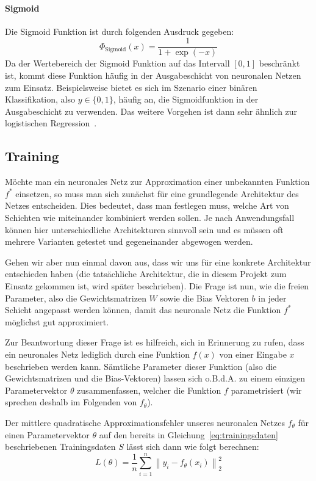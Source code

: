 \paragraph{Sigmoid} Die Sigmoid Funktion ist durch folgenden Ausdruck gegeben:
\begin{equation*}
    \Phi_\text{Sigmoid}(x) = \frac{1}{1 + \exp{(-x)}}
\end{equation*}
Da der Wertebereich der Sigmoid Funktion auf das Intervall $[0, 1]$
beschr\"ankt ist, kommt diese Funktion h\"aufig in der Ausgabeschicht
von neuronalen Netzen zum Einsatz. Beispielsweise bietet es sich im
Szenario einer bin\"aren Klassifikation, also $y \in \{0, 1\}$, h\"aufig
an, die Sigmoidfunktion in der Ausgabeschicht zu verwenden.
Das weitere Vorgehen ist dann sehr \"ahnlich zur
logistischen Regression~\cite{statistical_learning}.

\subsection{Training}
\label{sec:training}

M\"ochte man ein neuronales Netz zur Approximation einer unbekannten
Funktion $f^*$ einsetzen, so muss man sich zun\"achst f\"ur eine
grundlegende Architektur des Netzes entscheiden.
Dies bedeutet, dass man festlegen muss, welche Art von Schichten wie
miteinander kombiniert werden sollen.
Je nach Anwendungsfall k\"onnen hier unterschiedliche Architekturen
sinnvoll sein und es m\"ussen oft mehrere Varianten getestet und
gegeneinander abgewogen werden.

Gehen wir aber nun einmal davon aus, dass wir uns f\"ur eine konkrete
Architektur entschieden haben (die tats\"achliche Architektur, die in
diesem Projekt zum Einsatz gekommen ist, wird sp\"ater beschrieben).
Die Frage ist nun, wie die freien Parameter, also die
Gewichtsmatrizen $W$ sowie die Bias Vektoren $b$ in jeder Schicht angepasst
werden k\"onnen, damit das neuronale Netz die Funktion $f^*$ m\"oglichst
gut approximiert.

Zur Beantwortung dieser Frage ist es hilfreich, sich in Erinnerung
zu rufen, dass ein neuronales Netz lediglich durch eine Funktion
$f(x)$ von einer Eingabe $x$ beschrieben werden kann.
S\"amtliche Parameter dieser Funktion (also die Gewichtsmatrizen und
die Bias-Vektoren) lassen sich o.B.d.A. zu einem einzigen
Parametervektor $\theta$ zusammenfassen, welcher die Funktion $f$
parametrisiert (wir sprechen deshalb im Folgenden von $f_\theta$).

Der mittlere quadratische Approximationsfehler unseres neuronalen Netzes
$f_\theta$ f\"ur einen Parametervektor $\theta$ auf den bereits
in Gleichung~\ref{eq:trainingsdaten} beschriebenen Trainingsdaten $S$
l\"asst sich dann wie folgt berechnen:
\begin{equation}
    L(\theta) = \frac{1}{n} \sum_{i=1}^n \left\lVert y_i - f_\theta(x_i) \right\lVert_2^2
\end{equation}

